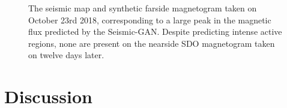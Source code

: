 \documentclass[11pt,a4paper,onecolumn]{report}
\begin{document}
\begin{figure}[t]%
  \centering
  \caption[]{The seismic map  and synthetic farside
  magnetogram  taken on October 23rd 2018, corresponding to a
  large peak in the magnetic flux predicted by the Seismic-GAN. Despite
  predicting intense active regions, none are present on the nearside SDO
  magnetogram  taken on twelve days later.}
  \label{fig:2018_peak}
\end{figure}



%
%
%
%
%
\chapter{Discussion}
\label{chap:discussion}
%
%
%
%
%
\end{document}
